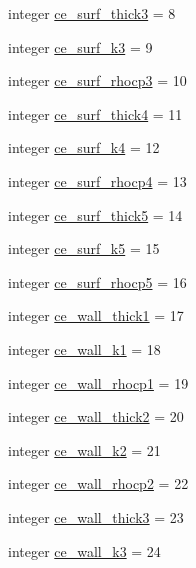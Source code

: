 \begin{DoxyCompactItemize}
\item 
integer \hyperlink{namespacecolnamesinputfiles_a9cb2fcbad1aaf1ade909fb24cd396c32}{ce\+\_\+surf\+\_\+thick3} = 8
\item 
integer \hyperlink{namespacecolnamesinputfiles_a623769edc0d32bef8eab4a0025402f28}{ce\+\_\+surf\+\_\+k3} = 9
\item 
integer \hyperlink{namespacecolnamesinputfiles_a9c670c6cf85f64e4c5b61a0209cacb30}{ce\+\_\+surf\+\_\+rhocp3} = 10
\item 
integer \hyperlink{namespacecolnamesinputfiles_acbb118b6dc2c3dc14466f731864bee59}{ce\+\_\+surf\+\_\+thick4} = 11
\item 
integer \hyperlink{namespacecolnamesinputfiles_a93e5f09a71dccea7f06face041ff36b4}{ce\+\_\+surf\+\_\+k4} = 12
\item 
integer \hyperlink{namespacecolnamesinputfiles_a4f0e75fde03b6e6bff1b827c31e1c5bb}{ce\+\_\+surf\+\_\+rhocp4} = 13
\item 
integer \hyperlink{namespacecolnamesinputfiles_a4f79d61f519bb49ecc390e2c0f49b191}{ce\+\_\+surf\+\_\+thick5} = 14
\item 
integer \hyperlink{namespacecolnamesinputfiles_adeeb66b92b53599afbf7da1794c9430b}{ce\+\_\+surf\+\_\+k5} = 15
\item 
integer \hyperlink{namespacecolnamesinputfiles_a75aa30718f45e14f8d00c610f774f855}{ce\+\_\+surf\+\_\+rhocp5} = 16
\item 
integer \hyperlink{namespacecolnamesinputfiles_a9a74b41366de2662467abd8bc37dc81a}{ce\+\_\+wall\+\_\+thick1} = 17
\item 
integer \hyperlink{namespacecolnamesinputfiles_a3679e3ae276d6f4c22a89150d9f41a94}{ce\+\_\+wall\+\_\+k1} = 18
\item 
integer \hyperlink{namespacecolnamesinputfiles_a82e9323d2bc27d098e0411095b87a4fc}{ce\+\_\+wall\+\_\+rhocp1} = 19
\item 
integer \hyperlink{namespacecolnamesinputfiles_a48a640eafb5884a4d027889e5263e54d}{ce\+\_\+wall\+\_\+thick2} = 20
\item 
integer \hyperlink{namespacecolnamesinputfiles_acb05c213823b9b789818112daa485bb3}{ce\+\_\+wall\+\_\+k2} = 21
\item 
integer \hyperlink{namespacecolnamesinputfiles_ab962fb70fd00cc5b904e6a0c6820c15e}{ce\+\_\+wall\+\_\+rhocp2} = 22
\item 
integer \hyperlink{namespacecolnamesinputfiles_af5d49c62769ff9de6925eef9bcf1659a}{ce\+\_\+wall\+\_\+thick3} = 23
\item 
integer \hyperlink{namespacecolnamesinputfiles_a485c8e1bb067002bd9cdcc2ab9a025f5}{ce\+\_\+wall\+\_\+k3} = 24

\end{DoxyCompactItemize}
